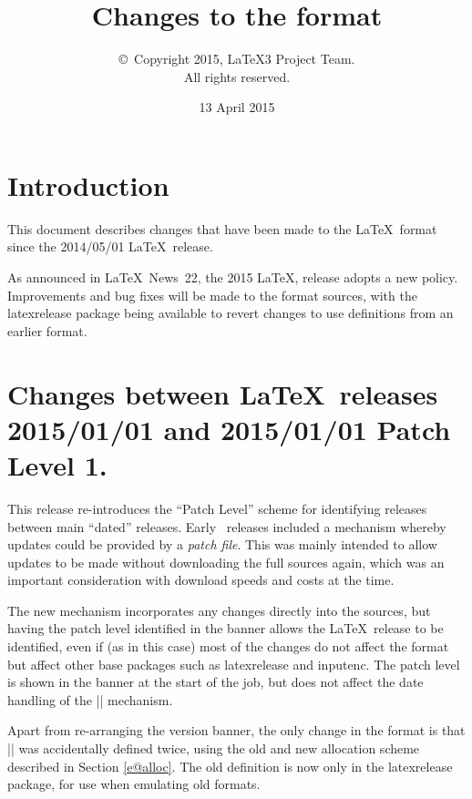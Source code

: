 \documentclass{ltxguide}
\title{Changes to the \LaTeXe{} format}
\author{\copyright~Copyright 2015, \LaTeX3 Project Team.\\
   All rights reserved.}
\date{13 April 2015}
\newcommand\Lpack[1]{\textsf{#1}}
\begin{document}
 
\maketitle
 
\tableofcontents

\newpage
 
\section{Introduction}
 
This document describes changes that have been made to the \LaTeX\ format since the 2014/05/01 \LaTeX\ release.

As announced in \LaTeX\ News~22, the 2015 \LaTeX, release adopts a new
policy. Improvements and bug fixes will be made to the format sources,
with the \Lpack{latexrelease} package being available to revert
changes to use definitions from an earlier format.


\section{Changes between \LaTeX\ releases 2015/01/01 and 2015/01/01 Patch Level 1.}
This release re-introduces the ``Patch Level'' scheme for identifying
releases between main ``dated'' releases. Early \LaTeXe\ releases
included a mechanism whereby updates could be provided by a 
\emph{patch
  file}. This was mainly intended to allow updates to be made without
downloading the full sources again, which was an important
consideration with download speeds and costs at the time.

The new mechanism incorporates any changes directly into the sources,
but having the patch level identified in the banner allows the
\LaTeX\ release to be identified, even if (as in this case) most of the
changes do not affect the format but affect other base packages such
as \Lpack{latexrelease} and \Lpack{inputenc}. The patch level is shown
in the banner at the start of the job, but does not affect the date
handling of the |\IncludeInRelease| mechanism.

Apart from re-arranging the version banner, the only change in the
format is that |\newtoks| was accidentally defined twice, using the
old and new allocation scheme described in Section \ref{e@alloc}.
The old definition is now only in the \Lpack{latexrelease} package,
for use when emulating old formats.
\end{document}
